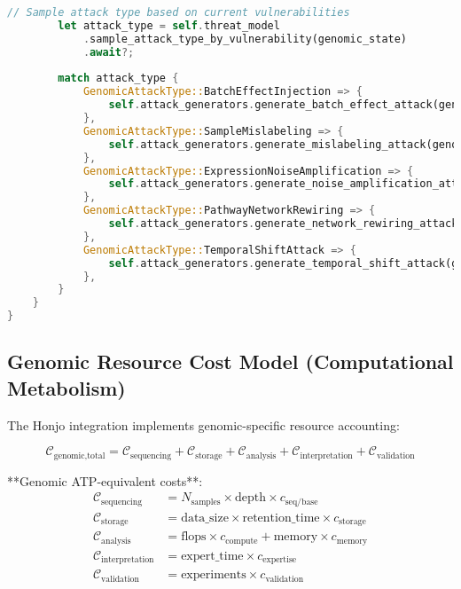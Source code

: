 \documentclass[12pt,a4paper]{article}
\begin{document}
\begin{lstlisting}[language=Rust, caption=Honjo Masamune Genomic Truth Engine Integration]
        // Sample attack type based on current vulnerabilities
        let attack_type = self.threat_model
            .sample_attack_type_by_vulnerability(genomic_state)
            .await?;
        
        match attack_type {
            GenomicAttackType::BatchEffectInjection => {
                self.attack_generators.generate_batch_effect_attack(genomic_state).await
            },
            GenomicAttackType::SampleMislabeling => {
                self.attack_generators.generate_mislabeling_attack(genomic_state).await
            },
            GenomicAttackType::ExpressionNoiseAmplification => {
                self.attack_generators.generate_noise_amplification_attack(genomic_state).await
            },
            GenomicAttackType::PathwayNetworkRewiring => {
                self.attack_generators.generate_network_rewiring_attack(genomic_state).await
            },
            GenomicAttackType::TemporalShiftAttack => {
                self.attack_generators.generate_temporal_shift_attack(genomic_state).await
            },
        }
    }
}
\end{lstlisting}

\subsection{Genomic Resource Cost Model (Computational Metabolism)}

The Honjo integration implements genomic-specific resource accounting:

\begin{equation}
\mathcal{C}_{\text{genomic,total}} = \mathcal{C}_{\text{sequencing}} + \mathcal{C}_{\text{storage}} + \mathcal{C}_{\text{analysis}} + \mathcal{C}_{\text{interpretation}} + \mathcal{C}_{\text{validation}}
\end{equation}

**Genomic ATP-equivalent costs**:
\begin{align}
\mathcal{C}_{\text{sequencing}} &= N_{\text{samples}} \times \text{depth} \times c_{\text{seq/base}} \\
\mathcal{C}_{\text{storage}} &= \text{data\_size} \times \text{retention\_time} \times c_{\text{storage}} \\
\mathcal{C}_{\text{analysis}} &= \text{flops} \times c_{\text{compute}} + \text{memory} \times c_{\text{memory}} \\
\mathcal{C}_{\text{interpretation}} &= \text{expert\_time} \times c_{\text{expertise}} \\
\mathcal{C}_{\text{validation}} &= \text{experiments} \times c_{\text{validation}}
\end{align}
\end{document}
